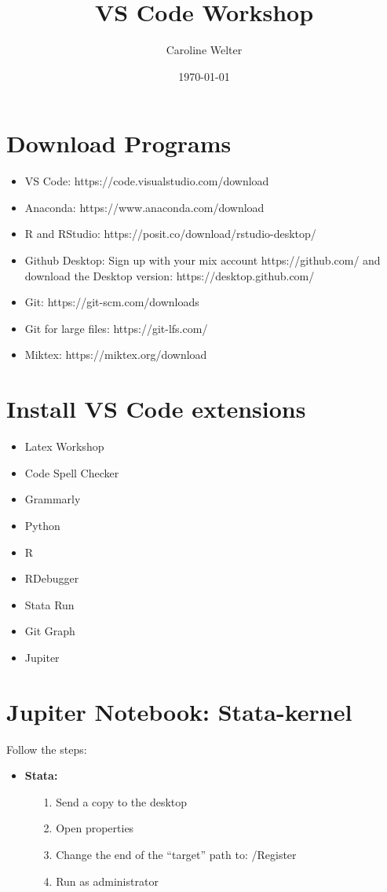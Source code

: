 \documentclass[12pt]{article}
\title{VS Code Workshop}
\author{Caroline Welter}
\date{\today}
\begin{document}
 
\maketitle
{}
\thispagestyle{empty}


\section{Download Programs}

\begin{itemize}
  \item VS Code: https://code.visualstudio.com/download
  \item Anaconda: https://www.anaconda.com/download 
  \item R and RStudio: https://posit.co/download/rstudio-desktop/
  \item Github Desktop: Sign up with your mix account https://github.com/ and download the Desktop version: https://desktop.github.com/
  \item Git: https://git-scm.com/downloads
  \item Git for large files: https://git-lfs.com/
  \item Miktex: https://miktex.org/download 
\end{itemize}

\section{Install VS Code extensions}
\begin{itemize}
  \item Latex Workshop
  \item Code Spell Checker
  \item Grammarly
  \item Python
  \item R
  \item RDebugger
  \item Stata Run
  \item Git Graph
  \item Jupiter
\end{itemize}

\section{Jupiter Notebook: Stata-kernel}

Follow the steps:
\begin{itemize}
  \item \textbf{Stata:}
    \begin{itemize}
      \item[1.] Send a copy to the desktop
      \item[2.] Open properties 
      \item[3.] Change the end of the “target” path to:  /Register
      \item[4.] Run as administrator
    \end{itemize}
\end{itemize}
\end{document}
